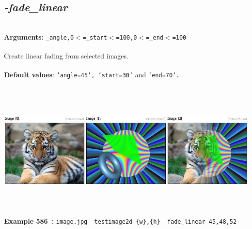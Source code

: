 \documentclass[a4paper,11pt,twoside]{book}
\begin{document}
\subsection{\emph{-fade\_linear} }\vspace*{-0.5em}
~\\\textbf{Arguments: } 
{\small \texttt{\_angle,0$<$=\_start$<$=100,0$<$=\_end$<$=100}}\\~\\
Create linear fading from selected images.
~\\~\\\textbf{Default values}: {\small \texttt{'angle=45', 'start=30'} and \texttt{'end=70'.}}
\begin{center}\includegraphics[keepaspectratio=true,height=7cm,width=\textwidth]{img/gmic_def586.jpg}\\
{\footnotesize \textbf{Example 586~:} \texttt{image.jpg -testimage2d \{w\},\{h\} --fade\_linear 45,48,52}}
\end{center}
\end{document}
